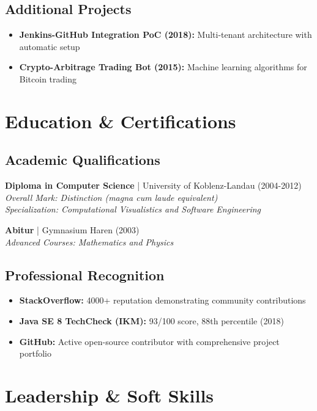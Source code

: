 \documentclass[10pt,a4paper]{article}
\begin{document}
\subsection{Additional Projects}
\begin{itemize}[leftmargin=*,noitemsep,topsep=0pt]
\item \textbf{Jenkins-GitHub Integration PoC (2018):} Multi-tenant architecture with automatic setup
\item \textbf{Crypto-Arbitrage Trading Bot (2015):} Machine learning algorithms for Bitcoin trading
\end{itemize}

\section{Education \& Certifications}

\subsection{Academic Qualifications}
\textbf{Diploma in Computer Science} | University of Koblenz-Landau (2004-2012) \\
\textit{Overall Mark: Distinction (magna cum laude equivalent)} \\
\textit{Specialization: Computational Visualistics and Software Engineering}

\textbf{Abitur} | Gymnasium Haren (2003) \\
\textit{Advanced Courses: Mathematics and Physics}

\subsection{Professional Recognition}
\begin{itemize}[leftmargin=*,noitemsep,topsep=0pt]
\item \textbf{StackOverflow:} 4000+ reputation demonstrating community contributions
\item \textbf{Java SE 8 TechCheck (IKM):} 93/100 score, 88th percentile (2018)
\item \textbf{GitHub:} Active open-source contributor with comprehensive project portfolio
\end{itemize}

\section{Leadership \& Soft Skills}
\end{document}
